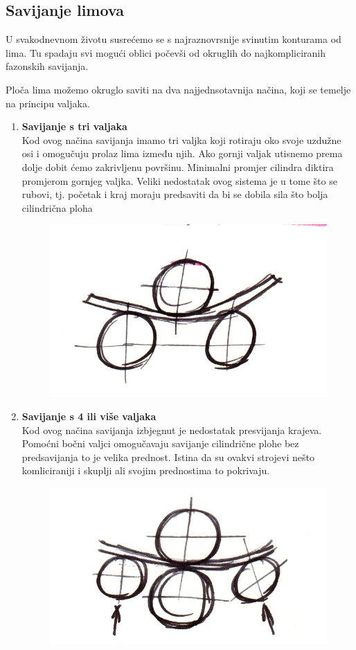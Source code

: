 \documentclass[a4paper,12pt]{article}
\numberwithin{figure}{section}
\begin{document}
\subsection{Savijanje limova}
U svakodnevnom životu susrećemo se s najraznovrsnije svinutim konturama od lima. Tu spadaju svi mogući oblici počevši od okruglih do najkompliciranih fazonskih savijanja. \par
Ploča lima možemo okruglo saviti na dva najjednsotavnija načina, koji se temelje na principu valjaka.
\begin{enumerate}
\item \textbf{Savijanje s tri valjaka} \\
Kod ovog načina savijanja imamo tri valjka koji rotiraju oko svoje uzdužne osi i omogučuju prolaz lima između njih. Ako gornji valjak utisnemo prema dolje dobit ćemo zakrivljenu površinu. Minimalni promjer cilindra diktira promjerom gornjeg valjka. Veliki nedostatak ovog sistema je u tome što se rubovi, tj. početak i kraj moraju predsaviti da bi se dobila sila što bolja cilindrična ploha
\begin{figure}[!h]
\centering
\includegraphics[scale=0.15]{image_48-1.png}
\end{figure}
\FloatBarrier
\item \textbf{Savijanje s 4 ili više valjaka} \\
Kod ovog načina savijanja izbjegnut je nedostatak presvijanja krajeva. Pomoćni bočni valjci omogučavaju savijanje cilindrične plohe bez predsavijanja to je velika prednost. Istina da su ovakvi strojevi nešto komliciraniji i skuplji ali svojim prednostima to pokrivaju.
\begin{figure}[!h]
\centering
\includegraphics[scale=0.15]{image_48-2.png}

\end{figure}
\end{enumerate}
\end{document}

